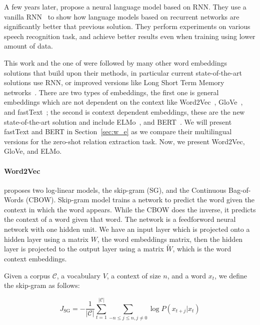 A few years later, \citet{Mikolov2010RecurrentNN} propose a neural language model based on RNN. They use a vanilla RNN~\citep{elman1990finding} to show how language models based on recurrent networks are significantly better that previous solution. They perform experiments on various speech recognition task, and achieve better results even when training using lower amount of data.

This work and the one of \cite{bengio2000nnlm} were followed by many other word embeddings solutions that build upon their methods, in particular current state-of-the-art solutions use RNN, or improved versions like Long Short Term Memory networks~\citep{hochreiter1997long}. There are two types of embeddings, the first one is general embeddings which are not dependent on the context like Word2Vec~\citep{mikolov2013models,mikolov2013distributed}, GloVe~\citep{pennington2014glove}, and fastText~\citep{bojanowski2016enriching}; the second is context dependent embeddings, these are the new state-of-the-art solution and include ELMo~\citep{peters2018elmo}, and BERT~\citep{devlin2018bert}. We will present fastText and BERT in Section~\ref{sec:w_e} as we compare their multilingual versions for the zero-shot relation extraction task. Now, we present Word2Vec, GloVe, and ELMo.


\paragraph{Word2Vec} \cite{mikolov2013models} proposes two log-linear models, the skip-gram (SG), and the Continuous Bag-of-Words (CBOW). Skip-gram model trains a network to predict the word given the context in which the word appears. While the CBOW does the inverse, it predicts the context of a word given that word. The network is a feedforword neural network with one hidden unit. We have an input layer which is projected onto a hidden layer using a matrix $W$, the word embeddings matrix, then the hidden layer is projected to the output layer using a matrix $\tilde{W}$, which is the word context embeddings. 

Given a corpus $\mathcal{C}$, a vocabulary $V$, a context of size $n$, and a word $x_t$, we define the skip-gram as follows:

\begin{equation}
J_{\mathrm{SG}}=-\frac{1}{|\mathcal{C}|} \sum_{t=1}^{|\mathcal{C}|} \sum_{-n \leq j \leq n, j \neq 0} \log P\left(x_{t+j} | x_{t}\right)
\end{equation}

